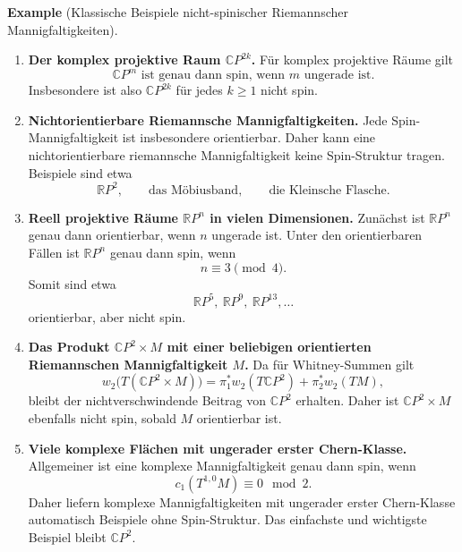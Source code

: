 \documentclass[10pt, letterpaper]{article}
\newcommand{\CP}{\mathbb{C}P}
\newcommand{\RP}{\mathbb{R}P}
\newcommand{\CustomHeading}[3]{%
  \par\medskip\noindent%
  \textbf{#1 #2} \textnormal{(#3)}.\enskip%
}
\newenvironment{EXA}[2]{\CustomHeading{Example}{#1}{#2}}{}
\begin{document}
\begin{EXA}{}{Klassische Beispiele nicht-spinischer Riemannscher Mannigfaltigkeiten}

\begin{enumerate}
    \item \textbf{Der komplex projektive Raum \(\CP^{2k}\).}  
    Für komplex projektive Räume gilt
    \[
    \CP^m \text{ ist genau dann spin, wenn } m \text{ ungerade ist.}
    \]
    Insbesondere ist also \(\CP^{2k}\) für jedes \(k\ge 1\) nicht spin.

    \item \textbf{Nichtorientierbare Riemannsche Mannigfaltigkeiten.}  
    Jede Spin-Mannigfaltigkeit ist insbesondere orientierbar. Daher kann eine nichtorientierbare riemannsche Mannigfaltigkeit keine Spin-Struktur tragen. Beispiele sind etwa
    \[
    \RP^{2}, \qquad \text{das Möbiusband}, \qquad \text{die Kleinsche Flasche}.
    \]

    \item \textbf{Reell projektive Räume \(\RP^n\) in vielen Dimensionen.}  
    Zunächst ist \(\RP^n\) genau dann orientierbar, wenn \(n\) ungerade ist. Unter den orientierbaren Fällen ist \(\RP^n\) genau dann spin, wenn
    \[
    n\equiv 3 \pmod 4.
    \]
    Somit sind etwa
    \[
    \RP^5,\ \RP^9,\ \RP^{13},\dots
    \]
    orientierbar, aber nicht spin.

    \item \textbf{Das Produkt \(\CP^2\times M\) mit einer beliebigen orientierten Riemannschen Mannigfaltigkeit \(M\).}  
    Da für Whitney-Summen gilt
    \[
    w_2\bigl(T(\CP^2\times M)\bigr)
    =
    \pi_1^*w_2(T\CP^2)+\pi_2^*w_2(TM),
    \]
    bleibt der nichtverschwindende Beitrag von \(\CP^2\) erhalten. Daher ist \(\CP^2\times M\) ebenfalls nicht spin, sobald \(M\) orientierbar ist.

    \item \textbf{Viele komplexe Flächen mit ungerader erster Chern-Klasse.}  
    Allgemeiner ist eine komplexe Mannigfaltigkeit genau dann spin, wenn
    \[
    c_1(T^{1,0}M)\equiv 0 \mod 2.
    \]
    Daher liefern komplexe Mannigfaltigkeiten mit ungerader erster Chern-Klasse automatisch Beispiele ohne Spin-Struktur. Das einfachste und wichtigste Beispiel bleibt \(\CP^2\).
\end{enumerate}

\end{EXA}




\bigskip
\end{document}
